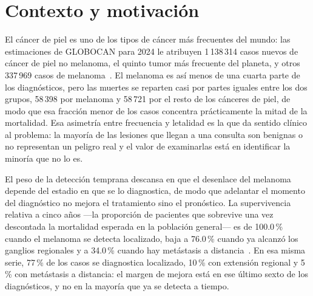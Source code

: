 
\section{Contexto y motivación}
\label{sec:intro_contexto}

El cáncer de piel es uno de los tipos de cáncer más frecuentes del mundo: las estimaciones de GLOBOCAN para
2024 le atribuyen 1\,138\,314 casos nuevos de cáncer de piel no melanoma, el quinto tumor más frecuente del
planeta, y otros 337\,969 casos de melanoma~\cite{sung2026global}. El melanoma es así menos de una cuarta
parte de los diagnósticos, pero las muertes se reparten casi por partes iguales entre los dos grupos, 58\,398
por melanoma y 58\,721 por el resto de los cánceres de piel, de modo que esa fracción menor de los casos
concentra prácticamente la mitad de la mortalidad. Esa asimetría entre frecuencia y letalidad es la que da
sentido clínico al problema: la mayoría de las lesiones que llegan a una consulta son benignas o no
representan un peligro real y el valor de examinarlas está en identificar la minoría que no lo es.

El peso de la detección temprana descansa en que el desenlace del melanoma depende del estadio en que se lo
diagnostica, de modo que adelantar el momento del diagnóstico no mejora el tratamiento sino el pronóstico. La
supervivencia relativa a cinco años —la proporción de pacientes que sobrevive una vez descontada la
mortalidad esperada en la población general— es de 100.0\,\% cuando el melanoma se detecta localizado, baja a
76.0\,\% cuando ya alcanzó los ganglios regionales y a 34.0\,\% cuando hay metástasis a
distancia~\cite{nci2026melanoma}. En esa misma serie, 77\,\% de los casos se diagnostica localizado, 10\,\%
con extensión regional y 5\,\% con metástasis a distancia: el margen de mejora está en ese último sexto de
los diagnósticos, y no en la mayoría que ya se detecta a tiempo.

